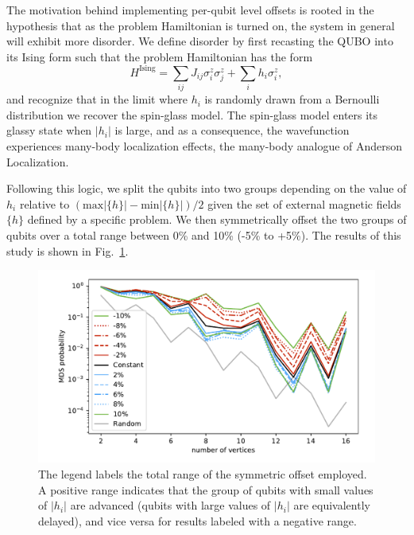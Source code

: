 \documentclass[prd,twocolumn,tightenlines,preprintnumbers,showpacs,superscriptaddress,notitlepage,nofootinbib,eqsecnum,floatfix,longbibliography]{revtex4}
\begin{document}
The motivation behind implementing per-qubit level offsets is rooted in the hypothesis that as the problem Hamiltonian is turned on, the system in general will exhibit more disorder.
We define disorder by first recasting the QUBO into its Ising form such that the problem Hamiltonian has the form
\begin{equation}
    H^{\textrm{Ising}} = \sum_{ij} J_{ij} \sigma^z_i \sigma^z_j + \sum_i h_i \sigma^z_i,
\end{equation}
and recognize that in the limit where $h_i$ is randomly drawn from a Bernoulli distribution we recover the spin-glass model.
The spin-glass model enters its glassy state when $|h_i|$ is large, and as a consequence, the wavefunction experiences many-body localization effects, the many-body analogue of Anderson Localization.

Following this logic, we split the qubits into two groups depending on the value of $h_i$ relative to $(\textrm{max}|\{h\}| - \textrm{min}|\{h\}|) / 2$ given the set of external magnetic fields $\{h\}$ defined by a specific problem.
We then symmetrically offset the two groups of qubits over a total range between 0\% and 10\% (-5\% to +5\%).
The results of this study is shown in Fig.~\ref{fig:dwave_offset}.

\begin{figure}[b]
    \centering
    \includegraphics[width=\columnwidth]{./figures/scaling_comparison_all.pdf}
    \caption{The legend labels the total range of the symmetric offset employed.
A positive range indicates that the group of qubits with small values of $|h_i|$ are advanced (qubits with large values of $|h_i|$ are equivalently delayed), and vice versa for results labeled with a negative range.}
    \label{fig:dwave_offset}
\end{figure}
\end{document}
